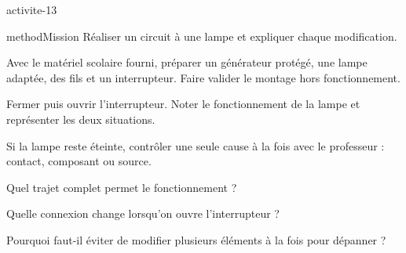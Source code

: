 \documentclass[12pt,twoside,openany]{book}
\begin{document}
\label{ch-13-activite}
\begin{pcFiche}{activite-13}
\begin{pcEncadre}{method}{Mission}
Réaliser un circuit à une lampe et expliquer chaque modification.\par
\end{pcEncadre}
\begin{questions}
\item Avec le matériel scolaire fourni, préparer un générateur protégé, une lampe adaptée, des fils et un interrupteur. Faire valider le montage hors fonctionnement.
\item Fermer puis ouvrir l’interrupteur. Noter le fonctionnement de la lampe et représenter les deux situations.
\item Si la lampe reste éteinte, contrôler une seule cause à la fois avec le professeur : contact, composant ou source.
\end{questions}
\begin{questions}
\item Quel trajet complet permet le fonctionnement ?
\item Quelle connexion change lorsqu’on ouvre l’interrupteur ?
\item Pourquoi faut-il éviter de modifier plusieurs éléments à la fois pour dépanner ?
\end{questions}
\end{pcFiche}
\label{ch-13-bilan}
\end{document}
